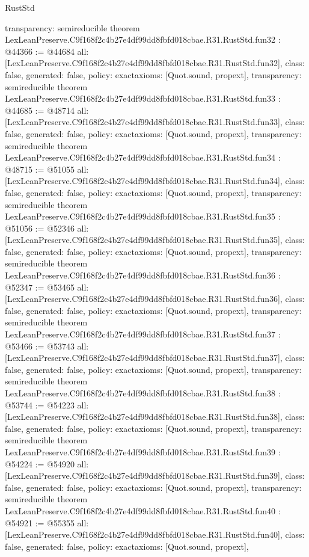 \begin{lexlean}{RustStd}
\begin{coremodule}
{  transparency: semireducible
}
theorem LexLeanPreserve.C9f168f2c4b27e4df99dd8fbfd018cbae.R31.RustStd.fun32 : @44366 := @44684 {
  all: [LexLeanPreserve.C9f168f2c4b27e4df99dd8fbfd018cbae.R31.RustStd.fun32],
  class: false,
  generated: false,
  policy: exact{axioms: [Quot.sound, propext]},
  transparency: semireducible
}
theorem LexLeanPreserve.C9f168f2c4b27e4df99dd8fbfd018cbae.R31.RustStd.fun33 : @44685 := @48714 {
  all: [LexLeanPreserve.C9f168f2c4b27e4df99dd8fbfd018cbae.R31.RustStd.fun33],
  class: false,
  generated: false,
  policy: exact{axioms: [Quot.sound, propext]},
  transparency: semireducible
}
theorem LexLeanPreserve.C9f168f2c4b27e4df99dd8fbfd018cbae.R31.RustStd.fun34 : @48715 := @51055 {
  all: [LexLeanPreserve.C9f168f2c4b27e4df99dd8fbfd018cbae.R31.RustStd.fun34],
  class: false,
  generated: false,
  policy: exact{axioms: [Quot.sound, propext]},
  transparency: semireducible
}
theorem LexLeanPreserve.C9f168f2c4b27e4df99dd8fbfd018cbae.R31.RustStd.fun35 : @51056 := @52346 {
  all: [LexLeanPreserve.C9f168f2c4b27e4df99dd8fbfd018cbae.R31.RustStd.fun35],
  class: false,
  generated: false,
  policy: exact{axioms: [Quot.sound, propext]},
  transparency: semireducible
}
theorem LexLeanPreserve.C9f168f2c4b27e4df99dd8fbfd018cbae.R31.RustStd.fun36 : @52347 := @53465 {
  all: [LexLeanPreserve.C9f168f2c4b27e4df99dd8fbfd018cbae.R31.RustStd.fun36],
  class: false,
  generated: false,
  policy: exact{axioms: [Quot.sound, propext]},
  transparency: semireducible
}
theorem LexLeanPreserve.C9f168f2c4b27e4df99dd8fbfd018cbae.R31.RustStd.fun37 : @53466 := @53743 {
  all: [LexLeanPreserve.C9f168f2c4b27e4df99dd8fbfd018cbae.R31.RustStd.fun37],
  class: false,
  generated: false,
  policy: exact{axioms: [Quot.sound, propext]},
  transparency: semireducible
}
theorem LexLeanPreserve.C9f168f2c4b27e4df99dd8fbfd018cbae.R31.RustStd.fun38 : @53744 := @54223 {
  all: [LexLeanPreserve.C9f168f2c4b27e4df99dd8fbfd018cbae.R31.RustStd.fun38],
  class: false,
  generated: false,
  policy: exact{axioms: [Quot.sound, propext]},
  transparency: semireducible
}
theorem LexLeanPreserve.C9f168f2c4b27e4df99dd8fbfd018cbae.R31.RustStd.fun39 : @54224 := @54920 {
  all: [LexLeanPreserve.C9f168f2c4b27e4df99dd8fbfd018cbae.R31.RustStd.fun39],
  class: false,
  generated: false,
  policy: exact{axioms: [Quot.sound, propext]},
  transparency: semireducible
}
theorem LexLeanPreserve.C9f168f2c4b27e4df99dd8fbfd018cbae.R31.RustStd.fun40 : @54921 := @55355 {
  all: [LexLeanPreserve.C9f168f2c4b27e4df99dd8fbfd018cbae.R31.RustStd.fun40],
  class: false,
  generated: false,
  policy: exact{axioms: [Quot.sound, propext]},
}
\end{coremodule}
\end{lexlean}
